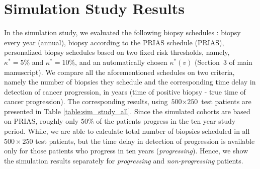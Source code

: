\section{Simulation Study Results}

In the simulation study, we evaluated the following biopsy schedules \citep{loeb2014heterogeneity, inoue2018comparative}: biopsy every year (annual), biopsy according to the PRIAS schedule (PRIAS), personalized biopsy schedules based on two fixed risk thresholds, namely, $\kappa^*=5\%$ and $\kappa^*=10\%$, and an automatically chosen $\kappa^*(v)$ (Section~3 of main manuscript). We compare all the aforementioned schedules on two criteria, namely the number of biopsies they schedule and the corresponding time delay in detection of cancer progression, in years (time of positive biopsy - true time of cancer progression). The corresponding results, using ${\mbox{500} \times \mbox{250}}$ test patients are presented in Table \ref{table:sim_study_all}. Since the simulated cohorts are based on PRIAS, roughly only 50\% of the patients progress in the ten year study period. While, we are able to calculate total number of biopsies scheduled in all $500 \times 250$ test patients, but the time delay in detection of progression is available only for those patients who progress in ten years (\textit{progressing}). Hence, we show the simulation results separately for \textit{progressing} and \textit{non-progressing} patients.

